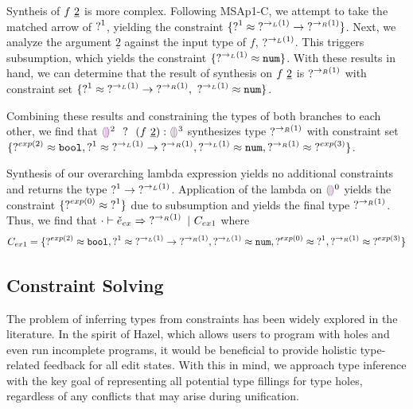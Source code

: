 Syntheis of $f ~\underline{2}$ is more complex. Following MSAp1-C, we attempt to take the matched arrow of $\operatorname{?}^1$, yielding the constraint $\{ \operatorname{?}^1 \approx \operatorname{?}^{\rightarrow_L(1)} \rightarrow \operatorname{?}^{\rightarrow_R(1)} \}$. Next, we analyze the argument $\underline{2}$ against the input type of $f$, $\operatorname{?}^{\rightarrow_L(1)}$. This triggers subsumption, which yields the constraint $\{ \operatorname{?}^{\rightarrow_L(1)} \approx \mathtt{num} \}$. With these results in hand, we can determine that the result of synthesis on  $f ~\underline{2}$ is $\operatorname{?}^{\rightarrow_R(1)}$ with constraint set $\{ \operatorname{?}^1 \approx \operatorname{?}^{\rightarrow_L(1)} \rightarrow \operatorname{?}^{\rightarrow_R(1)}, ~\operatorname{?}^{\rightarrow_L(1)} \approx \mathtt{num} \}$.

Combining these results and constraining the types of both branches to each other, we find that $\ECIf{\EEHole^2~}{~(\ECAp{f}{\underline{2}})}{\EEHole^3}$ synthesizes type $\operatorname{?}^{\rightarrow_R(1)}$ with constraint set $\{ \operatorname{?}^{exp(2)} \approx \mathtt{bool}, \operatorname{?}^1 \approx \operatorname{?}^{\rightarrow_L(1)} \rightarrow \operatorname{?}^{\rightarrow_R(1)},  \operatorname{?}^{\rightarrow_L(1)} \approx \mathtt{num},  \operatorname{?}^{\rightarrow_R(1)} \approx \operatorname{?}^{exp(3)}\}$. 

Synthesis of our overarching lambda expression yields no additional constraints and returns the type $\operatorname{?}^1 \rightarrow \operatorname{?}^{\rightarrow_L(1)}$. Application of the lambda on $\EEHole^0$ yields the constraint $\{ \operatorname{?}^{exp(0)} \approx \operatorname{?}^{1} \}$ due to subsumption and yields the final type  $\operatorname{?}^{\rightarrow_R(1)}$. Thus, we find that $\cdot \vdash \check{e}_{ex} \Rightarrow \operatorname{?}^{\rightarrow_R(1)} ~|~ C_{ex1}$ where 
$$C_{ex1} = \{ \operatorname{?}^{exp(2)} \approx \mathtt{bool}, \operatorname{?}^1 \approx \operatorname{?}^{\rightarrow_L(1)} \rightarrow \operatorname{?}^{\rightarrow_R(1)},  \operatorname{?}^{\rightarrow_L(1)} \approx \mathtt{num}, \operatorname{?}^{exp(0)} \approx \operatorname{?}^{1}, \operatorname{?}^{\rightarrow_R(1)} \approx \operatorname{?}^{exp(3)} \}$$



\usetikzlibrary{positioning,calc}

\subsection{Constraint Solving}
\label{sec:infalg}
The problem of inferring types from constraints has been widely explored in the literature. In the spirit of Hazel, which allows users to program with holes and even run incomplete programs, it would be beneficial to provide holistic type-related feedback for all edit states. With this in mind, we approach type inference with the key goal of representing all potential type fillings for type holes, regardless of any conflicts that may arise during unification.

